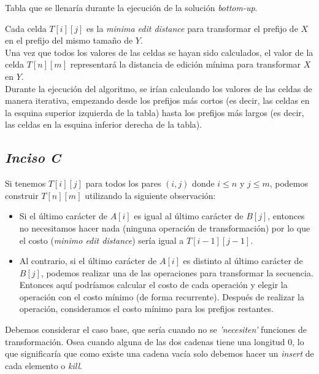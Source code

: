 \begin{center}
\small\textcolor{FSBlue}{Tabla que se llenaría durante la ejecución de la solución \textit{bottom-up}.}
\end{center}

Cada celda \(T[i][j]\) es la \textit{minima edit distance} para transformar el prefijo de \(X\) en el prefijo del mismo tamaño de \(Y\).\\

Una vez que todos los valores de las celdas se hayan sido calculados, el valor de la celda \(T[n][m]\) representará la distancia de edición mínima para transformar \(X\) en \(Y\).\\

Durante la ejecución del algoritmo, se irían calculando los valores de las celdas de manera iterativa, empezando desde los prefijos más cortos (es decir, las celdas en la esquina superior izquierda de la tabla) hasta los prefijos más largos (es decir, las celdas en la esquina inferior derecha de la tabla).\\

\subsection*{\textit{\textbf{Inciso C}}}

Si tenemos \(T[i][j]\) para todos los pares \((i, j)\) donde \(i \leq n\) y \(j \leq m\), podemos construir \(T[n][m]\) utilizando la siguiente observación:

\begin{itemize}
    \item Si el último carácter de \(A[i]\) es igual al último carácter de \(B[j]\), entonces no necesitamos hacer nada (ninguna operación de transformación) por lo que el costo (\textit{minimo edit distance}) sería igual a \(T[i-1][j-1]\).
    \item Al contrario, si el último carácter de \(A[i]\) es distinto al último carácter de \(B[j]\), podemos realizar una de las operaciones para transformar la secuencia. Entonces aquí podríamos calcular el costo de cada operación y elegir la operación con el costo mínimo (de forma recurrente). Después de realizar la operación, consideramos el costo mínimo para los prefijos restantes.
\end{itemize}

Debemos considerar el caso base, que sería cuando no se \textit{'necesiten'} funciones de transformación. Osea cuando alguna de las dos cadenas tiene una longitud \(0\), lo que significaría que como existe una cadena vacía solo debemos hacer un \textit{insert} de cada elemento o \textit{kill}.\\

